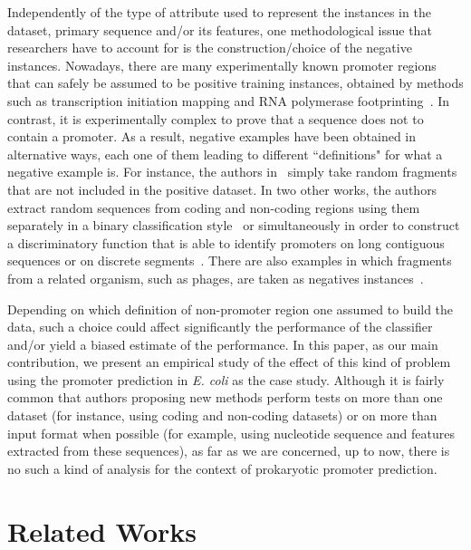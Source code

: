 \documentclass[conference]{IEEEtran}
\begin{document}
Independently of the type of attribute used to represent the instances in the dataset, primary sequence and/or its features, one methodological issue that researchers have to account for is the construction/choice of the negative instances. Nowadays, there are many experimentally known promoter regions that can safely be assumed to be positive training instances, obtained by methods such as transcription initiation mapping and RNA polymerase footprinting~\cite{gama2011}. In contrast, it is experimentally complex to prove that a sequence does not to contain a promoter. As a result, negative examples have been obtained in alternative ways, each one of them leading to different ``definitions" for what a negative example is. For instance, the authors in~\cite{bland2010} simply take random fragments that are not included in the positive dataset. In two other works, the authors extract random sequences from coding and non-coding regions using them separately in a binary classification style~\cite{gordon2003} or simultaneously in order to construct a discriminatory function that is able to identify promoters on long contiguous sequences or on discrete segments~\cite{hutchinson1996}. There are also examples in which fragments from a related organism, such as phages, are taken as negatives instances~\cite{towell1993,monteiro2005b}.

Depending on which definition of non-promoter region one assumed to build the data, such a choice could affect significantly the performance of the classifier and/or yield a biased estimate of the performance. In this paper, as our main contribution, we present an empirical study of the effect of this kind of problem using the promoter prediction in {\it E. coli} as the case study. Although it is fairly common that authors proposing new methods perform tests on more than one dataset (for instance, using coding and non-coding datasets) or on more than input format when possible (for example, using nucleotide sequence and features extracted from these sequences), as far as we are concerned, up to now, there is no such a kind of analysis for the context of prokaryotic promoter prediction.

\section{Related Works}
\end{document}
